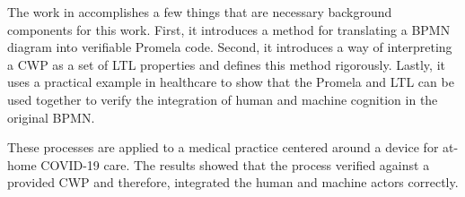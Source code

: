 
The work in \cite{mercer22} accomplishes a few things that are necessary background components for this work. First, it introduces a method for translating a BPMN diagram into verifiable Promela code. Second, it introduces a way of interpreting a CWP as a set of LTL properties and defines this method rigorously. Lastly, it uses a practical example in healthcare to show that the Promela and LTL can be used together to verify the integration of human and machine cognition in the original BPMN.

These processes are applied to a medical practice centered around a device for at-home COVID-19 care. The results showed that the process verified against a provided CWP and therefore, integrated the human and machine actors correctly.